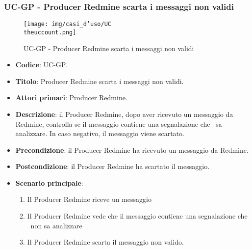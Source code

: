 \subsubsection{UC\theuccount-GP - Producer Redmine scarta i messaggi non validi}
\begin{figure}[H]
		\centering
		\texttt{[image: img/casi\_d'uso/UC\\theuccount.png]}\\
		\caption{UC\theuccount-GP - Producer Redmine scarta i messaggi non validi}
	\end{figure}
\begin{itemize}
	\item \textbf{Codice}: UC\theuccount-GP.
	\item \textbf{Titolo}: Producer Redmine scarta i messaggi non validi.
	\item \textbf{Attori primari}: Producer Redmine.
	\item \textbf{Descrizione}: il Producer Redmine, dopo aver ricevuto un messaggio da Redmine, controlla
	se il messaggio contiene una segnalazione che \progetto\ sa analizzare. In caso negativo, il messaggio viene scartato.
	\item \textbf{Precondizione}: il Producer Redmine ha ricevuto un messaggio da Redmine.
	\item \textbf{Postcondizione}: il Producer Redmine ha scartato il messaggio.
	\item \textbf{Scenario principale}:
	\begin{enumerate}
		\item Il Producer Redmine riceve un messaggio
		\item Il Producer Redmine vede che il messaggio contiene una segnalazione che \progetto\ non sa analizzare
		\item Il Producer Redmine scarta il messaggio non valido.
	\end{enumerate}
\end{itemize}
